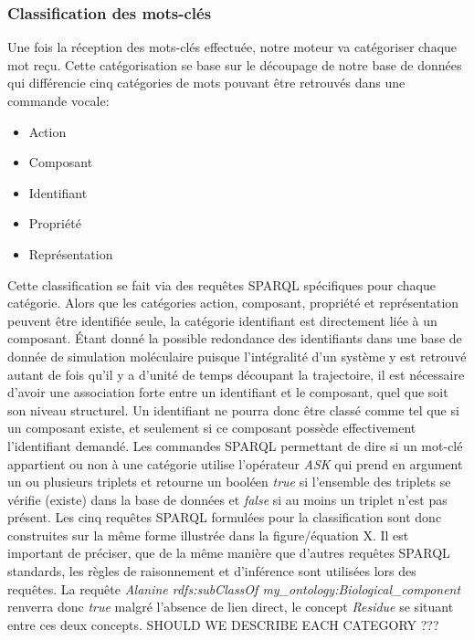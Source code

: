 \subsubsection{Classification des mots-clés}

Une fois la réception des mots-clés effectuée, notre moteur va catégoriser chaque mot reçu. Cette catégorisation se base sur le découpage de notre base de données qui différencie cinq catégories de mots pouvant être retrouvés dans une commande vocale:
\begin{itemize}
	\item Action
	\item Composant
	\item Identifiant
	\item Propriété
	\item Représentation
\end{itemize}

Cette classification se fait via des requêtes SPARQL spécifiques pour chaque catégorie. Alors que les catégories action, composant, propriété et représentation peuvent être identifiée seule, la catégorie identifiant est directement liée à un composant. Étant donné la possible redondance des identifiants dans une base de donnée de simulation moléculaire puisque l'intégralité d'un système y est retrouvé autant de fois qu'il y a d'unité de temps découpant la trajectoire, il est nécessaire d'avoir une association forte entre un identifiant et le composant, quel que soit son niveau structurel. Un identifiant ne pourra donc être classé comme tel que si un composant existe, et seulement si ce composant possède effectivement l'identifiant demandé. Les commandes SPARQL permettant de dire si un mot-clé appartient ou non à une catégorie utilise l'opérateur \textit{ASK} qui prend en argument un ou plusieurs triplets et retourne un booléen \textit{true} si l'ensemble des triplets se vérifie (existe) dans la base de données et \textit{false} si au moins un triplet n'est pas présent. Les cinq requêtes SPARQL formulées pour la classification sont donc construites sur la même forme illustrée dans la figure/équation X. Il est important de préciser, que de la même manière que d'autres requêtes SPARQL standards, les règles de raisonnement et d'inférence sont utilisées lors des requêtes. La requête \textit{Alanine rdfs:subClassOf my\_ontology:Biological\_component} renverra donc \textit{true} malgré l'absence de lien direct, le concept \textit{Residue} se situant entre ces deux concepts.
SHOULD WE DESCRIBE EACH CATEGORY ???

